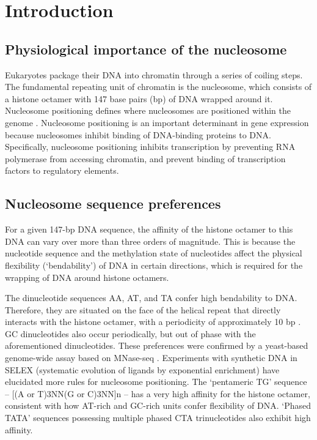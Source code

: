 \documentclass[parskip=full, numbers=noenddot]{scrbook}
\begin{document}
\section{Introduction}
\label{sec:emsaselex_intro}

\subsection{Physiological importance of the nucleosome}
\label{ssec:emsaselex_intro_importance}

Eukaryotes package their DNA into chromatin through a series of coiling steps.  The fundamental repeating unit of chromatin is the nucleosome, which consists of a histone octamer with 147 base pairs (bp) of DNA wrapped around it.  Nucleosome positioning defines where nucleosomes are positioned within the genome \citep{struhl_determinants_2013}.  Nucleosome positioning is an important determinant in gene expression because nucleosomes inhibit binding of DNA-binding proteins to DNA.  Specifically, nucleosome positioning inhibits transcription by preventing RNA polymerase from accessing chromatin, and prevent binding of transcription factors to regulatory elements.

\subsection{Nucleosome sequence preferences}
\label{ssec:emsaselex_intro_seqpref}

For a given 147-bp DNA sequence, the affinity of the histone octamer to this DNA can vary over more than three orders of magnitude.  This is because the nucleotide sequence and the methylation state of nucleotides affect the physical flexibility (`bendability') of DNA in certain directions, which is required for the wrapping of DNA around histone octamers.

The dinucleotide sequences AA, AT, and TA confer high bendability to DNA.  Therefore, they are situated on the face of the helical repeat that directly interacts with the histone octamer, with a periodicity of approximately 10 bp \citep{struhl_determinants_2013}.  GC dinucleotides also occur periodically, but out of phase with the aforementioned dinucleotides.  These preferences were confirmed by a yeast-based genome-wide assay based on MNase-seq \citep{segal_genomic_2006}.  Experiments with synthetic DNA in SELEX (systematic evolution of ligands by exponential enrichment) \citep{lowary_new_1998} have elucidated more rules for nucleosome positioning.  The `pentameric TG' sequence -- [(A or T)3NN(G or C)3NN]n -- has a very high affinity for the histone octamer, consistent with how AT-rich and GC-rich units confer flexibility of DNA.  `Phased TATA' sequences possessing multiple phased CTA trinucleotides also exhibit high affinity.
\end{document}
